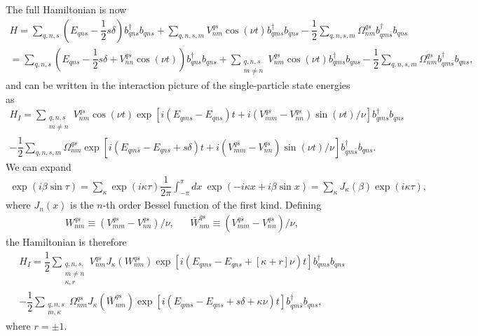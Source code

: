 \documentclass[aps,notitlepage,nofootinbib,10pt]{revtex4-1}
\newcommand{\f}[2]{\dfrac{#1}{#2}} %
\newcommand{\p}[1]{\left(#1\right)} %
\renewcommand{\sp}[1]{\left[#1\right]} %
\newcommand{\1}{\mathds{1}}
\begin{document}
The full Hamiltonian is now
\begin{multline}
  H = \sum_{q,n,s}\p{E_{qns}-\f12s\delta} b_{qns}^\dag b_{qns}
  + \sum_{q,n,s,m} V^{qs}_{nm} \cos\p{\nu t} b_{qms}^\dag b_{qns}
  - \f12\sum_{q,n,s,m} \Omega_{nm}^{qs} b_{qm\bar s}^\dag b_{qns} \\
  = \sum_{q,n,s}
  \p{E_{qns}-\f12s\delta+V^{qs}_{nn}\cos\p{\nu t}} b_{qns}^\dag b_{qns}
  + \sum_{\substack{q,n,s\\m\ne n}}
  V^{qs}_{nm} \cos\p{\nu t} b_{qms}^\dag b_{qns}
  - \f12\sum_{q,n,s,m} \Omega_{nm}^{qs} b_{qm\bar s}^\dag b_{qns},
\end{multline}
and can be written in the interaction picture of the single-particle
state energies as
\begin{multline}
  H_I = \sum_{\substack{q,n,s\\m\ne n}} V^{qs}_{nm} \cos\p{\nu t}
  \exp\sp{i\p{E_{qms}-E_{qns}}t
    + i\p{V^{qs}_{mm}-V^{qs}_{nn}}\sin\p{\nu t}/\nu}
  b_{qms}^\dag b_{qns} \\
  -\f12\sum_{q,n,s,m} \Omega_{nm}^{qs}
  \exp\sp{i\p{E_{qm\bar s}-E_{qns}+s\delta}t
    + i\p{V^{q\bar s}_{mm}-V^{qs}_{nn}}\sin\p{\nu t}/\nu}
  b_{qm\bar s}^\dag b_{qns}.
\end{multline}
We can expand
\begin{align}
  \exp\p{i\beta\sin\tau}
  = \sum_\kappa \exp\p{i\kappa\tau} \f1{2\pi}\int_{-\pi}^\pi dx~
  \exp\p{-i\kappa x+i\beta\sin x}
  = \sum_\kappa J_\kappa\p{\beta} \exp\p{i\kappa\tau},
\end{align}
where $J_n\p{x}$ is the $n$-th order Bessel function of the first
kind. Defining
\begin{align}
  W^{qs}_{nm} \equiv \p{V^{qs}_{mm} - V^{qs}_{nn}}/\nu,
  &&
  \bar W^{qs}_{nm} \equiv \p{V^{q\bar s}_{mm} - V^{qs}_{nn}}/\nu,
\end{align}
the Hamiltonian is therefore
\begin{multline}
  H_I = \f12 \sum_{\substack{q,n,s,\\m\ne n\\\kappa,r}} V^{qs}_{nm}
  J_\kappa\p{W^{qs}_{nm}}
  \exp\sp{i\p{E_{qms}-E_{qns}+\sp{\kappa+r}\nu}t}
  b_{qms}^\dag b_{qns} \\
  -\f12\sum_{\substack{q,n,s\\m,\kappa}} \Omega_{nm}^{qs}
  J_\kappa\p{\bar W^{qs}_{nm}}
  \exp\sp{i\p{E_{qm\bar s}-E_{qns}+s\delta+\kappa\nu}t}
  b_{qm\bar s}^\dag b_{qns},
\end{multline}
where $r=\pm1$.
\end{document}
